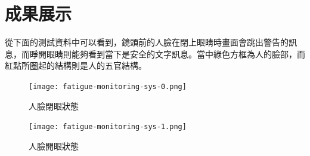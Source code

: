 \documentclass[10pt,UTF8]{ctexart}
\begin{document}
\newpage
\section{成果展示}

從下面的測試資料中可以看到，鏡頭前的人臉在閉上眼睛時畫面會跳出警告的訊息，而睜開眼睛則能夠看到當下是安全的文字訊息。當中綠色方框為人的臉部，而紅點所圈起的結構則是人的五官結構。

\begin{figure}[H]
\centering 
\texttt{[image: fatigue-monitoring-sys-0.png]} 
\caption{人臉閉眼狀態}
\label{Test}
\end{figure}

\begin{figure}[H]
\centering 
\texttt{[image: fatigue-monitoring-sys-1.png]} 
\caption{人臉開眼狀態}
\label{Test}
\end{figure}









\clearpage
\end{document}
